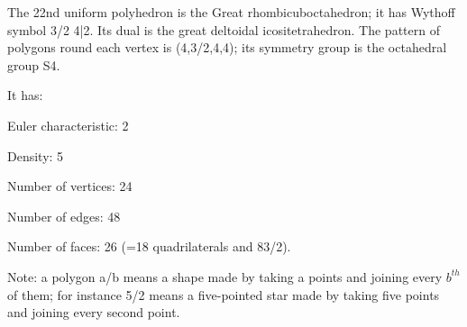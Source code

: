 The 22nd uniform polyhedron is the Great rhombicuboctahedron; it has Wythoff symbol 3/2 4|2. Its dual is the great deltoidal icositetrahedron. The pattern of polygons round each vertex is (4,3/2,4,4); its symmetry group is the octahedral group S4.\par
It has:\par
Euler characteristic: 2\par
Density: 5\par
Number of vertices: 24\par
Number of edges:  48\par
Number of faces: 26 (=18 quadrilaterals and 8{3/2}).\par
Note: a polygon a/b means a shape made by taking a points and joining every $b^{th}$  of them; for instance 5/2 means a five-pointed star made by taking five points and joining every second point.
